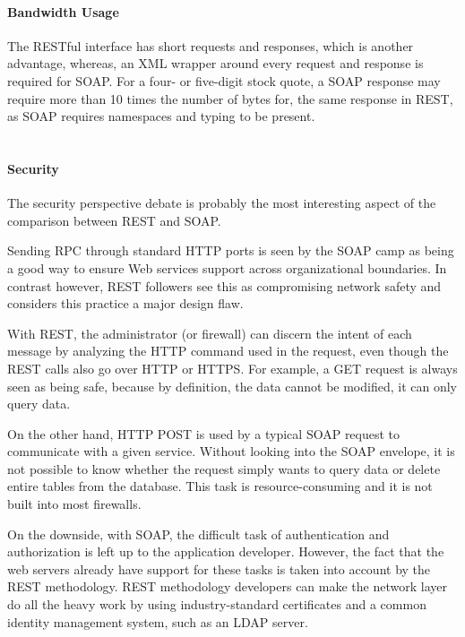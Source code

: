 \paragraph{Bandwidth Usage}

The RESTful interface has short requests and responses, which is another advantage, whereas, an \ac{XML} wrapper around every request and response is required for \ac{SOAP}. For a four- or five-digit stock quote, a \ac{SOAP} response may require more than 10 times the number of bytes for, the same response in \ac{REST}, as \ac{SOAP} requires namespaces and typing to be present. 
\\
\\
\paragraph{Security}
The security perspective debate is probably the most interesting aspect of the comparison between \ac{REST} and \ac{SOAP}. 

Sending \ac{RPC} through standard \ac{HTTP} ports is seen by the \ac{SOAP} camp as being a good way to ensure Web services support across organizational boundaries. In contrast however, \ac{REST} followers see this as compromising network safety and considers this practice a major design flaw.

With \ac{REST}, the administrator (or firewall) can discern the intent of each message by analyzing the \ac{HTTP} command used in the request, even though the \ac{REST} calls also go over \ac{HTTP} or \ac{HTTPS}. For example, a GET request is always seen as being safe, because by definition, the data cannot be modified, it can only query data.

On the other hand, \ac{HTTP} POST is used by a typical \ac{SOAP} request to communicate with a given service. Without looking into the \ac{SOAP} envelope, it is not possible to know whether the request simply wants to query data or delete entire tables from the database. This task is resource-consuming and it is not built into most firewalls.

On the downside, with \ac{SOAP}, the difficult task of authentication and authorization is left up to the application developer. However, the fact that the web servers already have support for these tasks is taken into account by the \ac{REST} methodology. \ac{REST} methodology developers can make the network layer do all the heavy work by using industry-standard certificates and a common identity management system, such as an \ac{LDAP} server.


